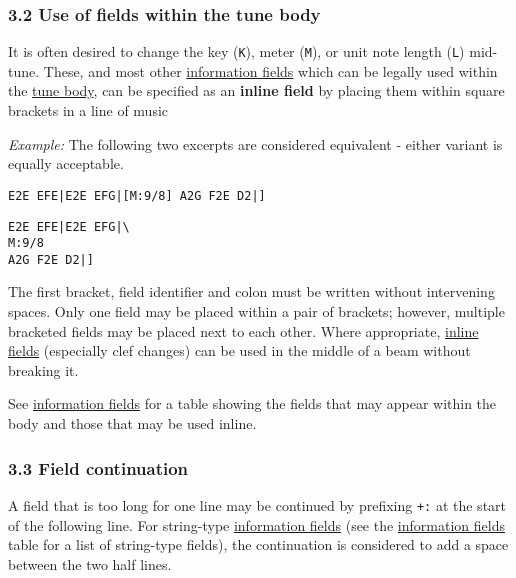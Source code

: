 \hypertarget{use_of_fields_within_the_tune_body}{\subsubsection{3.2 Use
of fields within the tune
body}\label{use_of_fields_within_the_tune_body}}

\href{}{}It is often desired to change the key (\texttt{K}), meter
(\texttt{M}), or unit note length (\texttt{L}) mid-tune. These, and most
other \protect\hyperlink{information_field_definition}{information
fields} which can be legally used within the
\protect\hyperlink{tune_body_definition}{tune body}, can be specified as
an \textbf{inline field} by placing them within square brackets in a
line of music

\emph{Example:} The following two excerpts are considered equivalent -
either variant is equally acceptable.

\begin{verbatim}
E2E EFE|E2E EFG|[M:9/8] A2G F2E D2|]
\end{verbatim}

\begin{verbatim}
E2E EFE|E2E EFG|\
M:9/8
A2G F2E D2|]
\end{verbatim}

The first bracket, field identifier and colon must be written without
intervening spaces. Only one field may be placed within a pair of
brackets; however, multiple bracketed fields may be placed next to each
other. Where appropriate,
\protect\hyperlink{inline_field_definition}{inline fields} (especially
clef changes) can be used in the middle of a beam without breaking it.

See \protect\hyperlink{information_fields}{information fields} for a
table showing the fields that may appear within the body and those that
may be used inline.

\hypertarget{field_continuation}{\subsubsection{3.3 Field
continuation}\label{field_continuation}}

A field that is too long for one line may be continued by prefixing
\texttt{+:} at the start of the following line. For string-type
\protect\hyperlink{information_field_definition}{information fields}
(see the \protect\hyperlink{information_fields}{information fields}
table for a list of string-type fields), the continuation is considered
to add a space between the two half lines.

